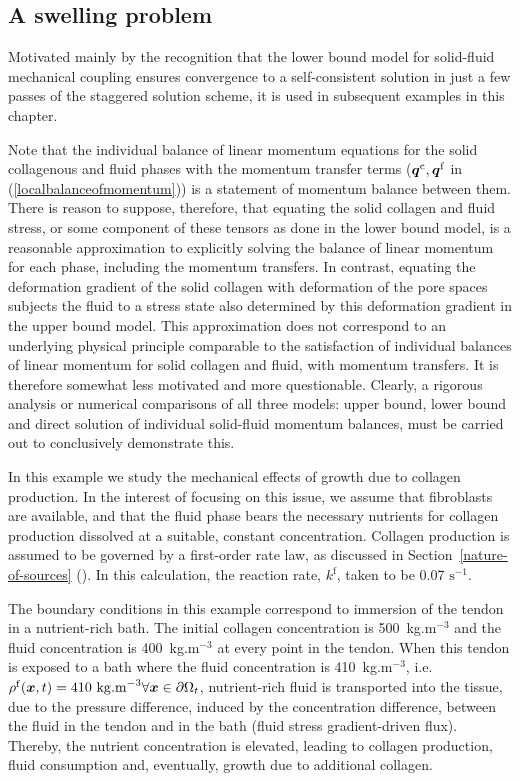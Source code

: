 \subsection{A swelling problem}
\label{swelling-1}

Motivated mainly by the recognition that the lower bound model for
solid-fluid mechanical coupling ensures convergence to a
self-consistent solution in just a few passes of the staggered
solution scheme, it is used in subsequent examples in this chapter.

Note that the individual balance of linear momentum equations for the
solid collagenous and fluid phases with the momentum transfer terms
($\mbox{\boldmath$ q$}^\mathrm{c}, \mbox{\boldmath$ q$}^\mathrm{f}$ in (\ref{localbalanceofmomentum}))
is a statement of momentum balance between them. There is reason to
suppose, therefore, that equating the solid collagen and fluid stress,
or some component of these tensors as done in the lower bound model,
is a reasonable approximation to explicitly solving the balance of
linear momentum for each phase, including the momentum transfers. In
contrast, equating the deformation gradient of the solid collagen with
deformation of the pore spaces subjects the fluid to a stress state
also determined by this deformation gradient in the upper bound
model. This approximation does not correspond to an underlying
physical principle comparable to the satisfaction of individual
balances of linear momentum for solid collagen and fluid, with
momentum transfers. It is therefore somewhat less motivated and more
questionable. Clearly, a rigorous analysis or numerical comparisons of
all three models: upper bound, lower bound and direct solution of
individual solid-fluid momentum balances, must be carried out to
conclusively demonstrate this.

In this example we study the mechanical effects of growth due to
collagen production. In the interest of focusing on this issue, we
assume that fibroblasts are available, and that the fluid phase bears
the necessary nutrients for collagen production dissolved at a
suitable, constant concentration. Collagen production is assumed to be
governed by a first-order rate law, as discussed in
Section~\ref{nature-of-sources} (). In this calculation, the
reaction rate, $k^\mathrm{f}$, taken to be 0.07 $\mathrm{s}^{-1}$.

The boundary conditions in this example correspond to immersion of the
tendon in a nutrient-rich bath. The initial collagen concentration is
500~kg.m$^{-3}$ and the fluid concentration is 400~kg.m$^{-3}$ at
every point in the tendon. When this tendon is exposed to a bath
where the fluid concentration is 410~kg.m$^{-3}$,
i.e. $\rho^\mathrm{f}(\mbox{\boldmath$ x$},t)=410~\mathrm{kg.m}^{-3} \forall \mbox{\boldmath$ x$} \in
\partial\Omega_t$, nutrient-rich fluid is transported into the tissue,
due to the pressure difference, induced by the concentration
difference, between the fluid in the tendon and in 
the bath (fluid stress gradient-driven flux). Thereby, the nutrient
concentration is elevated, leading to collagen production, fluid
consumption and, eventually, growth due to additional collagen. 

